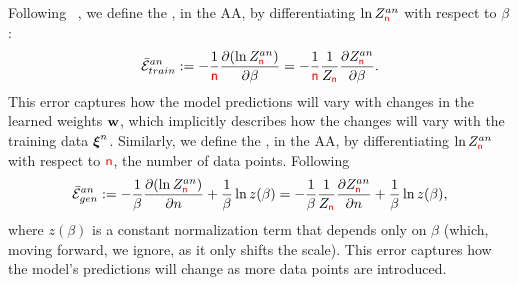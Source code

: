 Following ~\cite{LTS90, Solla2023},
we define the \emph{\AverageTrainingError}, in the AA,
by differentiating $\ln Z^{an}_{{\color{red}\sf{n}}}$ with respect to $\beta$:
\begin{align}
  \label{eqn:avgte_def}
  \bar{\mathcal{E}}_{train}^{an}
  := -\frac{1}{{\color{red}\sf{n}}}\dfrac{\partial (\ln Z^{an}_{{\color{red}\sf{n}}})}{\partial \beta} 
  = -\frac{1}{{\color{red}\sf{n}}}\frac{1}{Z_{{\color{red}\sf{n}}}}\dfrac{\partial Z^{an}_{{\color{red}\sf{n}}}}{\partial \beta} .
\end{align}
This error captures how the model predictions will vary with changes in the learned
weights ${\mathbf{w}}$, which implicitly describes how the changes will vary with the
training data $\boldsymbol{\xi}^{n}$.
%
Similarly, 
we define the \emph{\AverageGeneralizationError}, in the AA,
by differentiating $\ln Z^{an}_{{\color{red}\sf{n}}}$ with respect to ${\color{red}\sf{n}}$, the number of data points.
Following 
\begin{align}
  \label{eqn:avgge_def}
  \bar{\mathcal{E}}_{gen}^{an}
  := -\frac{1}{\beta}\dfrac{\partial (\ln Z^{an}_{{\color{red}\sf{n}}})}{\partial n}    +\frac{1}{\beta}\ln z(\beta)  
  =  -\frac{1}{\beta}\frac{1}{Z_{{\color{red}\sf{n}}}}\dfrac{\partial Z^{an}_{{\color{red}\sf{n}}}}{\partial n}
  +\frac{1}{\beta}\ln z(\beta) ,
\end{align}
where $z(\beta)$ is a constant normalization term that depends only on $\beta$ (which, moving forward, we ignore, as it only shifts the scale).
This error captures how the model’s predictions will change as more data points are introduced.

